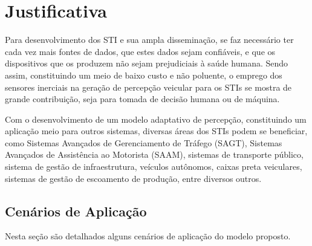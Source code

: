 \section{Justificativa}

Para desenvolvimento dos STI e sua ampla disseminação, se faz necessário ter cada vez mais fontes de dados, que estes dados sejam confiáveis, e que os dispositivos que os produzem não sejam prejudiciais à saúde humana. Sendo assim, constituindo um meio de baixo custo e não poluente, o emprego dos sensores inerciais na geração de percepção veicular para os STIs se mostra de grande contribuição, seja para tomada de decisão humana ou de máquina.

Com o desenvolvimento de um modelo adaptativo de percepção, constituindo um aplicação meio para outros sistemas, diversas áreas dos STIs podem se beneficiar, como Sistemas Avançados de Gerenciamento de Tráfego (SAGT), Sistemas Avançados de Assistência ao Motorista (SAAM), sistemas de transporte público, sistema de gestão de infraestrutura, veículos autônomos, caixas preta veiculares, sistemas de gestão de escoamento de produção, entre diversos outros.

\subsection{Cenários de Aplicação}

Nesta seção são detalhados alguns cenários de aplicação do modelo proposto.

